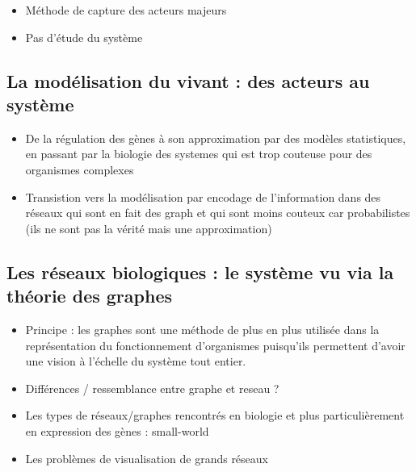 \begin{itemize}
  \item Méthode de capture des acteurs majeurs
  \item Pas d'étude du système 
\end{itemize}

\subsection{La modélisation du vivant : des acteurs au système}
\begin{itemize}
\item De la régulation des gènes à son approximation par des modèles statistiques, en passant par la biologie des systemes qui est trop couteuse pour des organismes complexes %
\item Transistion vers la modélisation par encodage de l'information dans des réseaux qui sont en fait des graph et qui sont moins couteux car probabilistes (ils ne sont pas la vérité mais une approximation)
\end{itemize}

\subsection{Les réseaux biologiques : le système vu via la théorie des graphes}
\begin{itemize}
\item Principe : les graphes sont une méthode de plus en plus utilisée dans la représentation du fonctionnement d'organismes puisqu'ils permettent d'avoir une vision à l'échelle du système tout entier.
\item Différences / ressemblance entre graphe et reseau ?
\item Les types de réseaux/graphes rencontrés en biologie et plus particulièrement en expression des gènes : small-world
\item Les problèmes de visualisation de grands réseaux %
\end{itemize}




